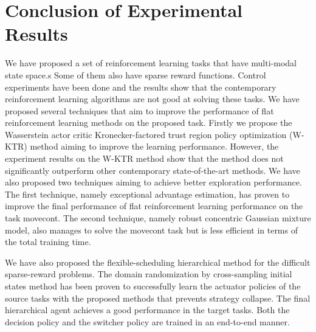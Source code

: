 \section{Conclusion of Experimental Results}
We have proposed a set of reinforcement learning tasks that have multi-modal state space.s Some of them also have sparse reward functions. Control experiments have been done and the results show that the contemporary reinforcement learning algorithms are not good at solving these tasks.
We have proposed several techniques that aim to improve the performance of flat reinforcement learning methods on the proposed task. Firstly we propose the Wasserstein actor critic Kronecker-factored trust region policy optimization (W-KTR) method aiming to improve the learning performance. However, the experiment results on the W-KTR method show that the method does not significantly outperform other contemporary state-of-the-art methods. We have also proposed two techniques aiming to achieve better exploration performance. The first technique, namely exceptional advantage estimation, has proven to improve the final performance of flat reinforcement learning performance on the task movecont. The second technique, namely robust concentric Gaussian mixture model, also manages to solve the movecont task but is less efficient in terms of the total training time. 


We have also proposed the flexible-scheduling hierarchical method for the difficult sparse-reward problems. The domain randomization by cross-sampling initial states method has been proven to successfully learn the actuator policies of the source tasks with the proposed methods that prevents strategy collapse. The final hierarchical agent achieves a good performance in the target tasks. Both the decision policy and the switcher policy are trained in an end-to-end manner. 